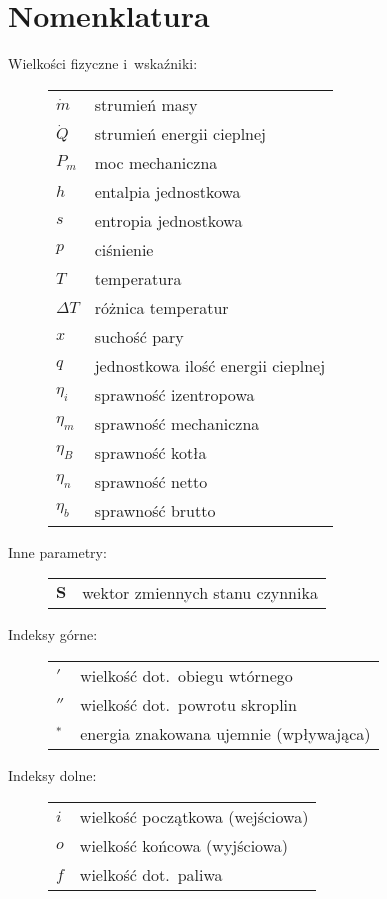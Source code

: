 \section{Nomenklatura}

\begin{description}

	\item[Wielkości fizyczne i~wskaźniki:] \hfill

\begin{tabular}{p{1.2cm}l}
	$\dot m$ & strumień masy \\
	$\dot Q$ & strumień energii cieplnej \\
	$P_m$ & moc mechaniczna \\
	$h$ & entalpia jednostkowa \\
	$s$ & entropia jednostkowa \\
	$p$ & ciśnienie \\
	$T$ & temperatura \\
	$\Delta T$ & różnica temperatur \\
	$x$ & suchość pary \\
	$q$ & jednostkowa ilość energii cieplnej \\
	$\eta_i$ & sprawność izentropowa \\
	$\eta_m$ & sprawność mechaniczna \\
	$\eta_B$ & sprawność kotła \\
	$\eta_n$ & sprawność netto \\
	$\eta_b$ & sprawność brutto \\
\end{tabular}

	\item[Inne parametry:] \hfill

\begin{tabular}{p{1.2cm}l}
	$\mathbf{S}$ & wektor zmiennych stanu czynnika \\
\end{tabular}

	\item[Indeksy górne:] \hfill

\begin{tabular}{p{1.2cm}l}
	$'$ & wielkość dot.~obiegu wtórnego \\
	$''$ & wielkość dot.~powrotu skroplin \\
	$^*$ & energia znakowana ujemnie (wpływająca) \\
\end{tabular}

	\item[Indeksy dolne:] \hfill

\begin{tabular}{p{1.2cm}l}
	$i$ & wielkość początkowa (wejściowa) \\
	$o$ & wielkość końcowa (wyjściowa) \\
	$f$ & wielkość dot.~paliwa \\
\end{tabular}

\end{description}
